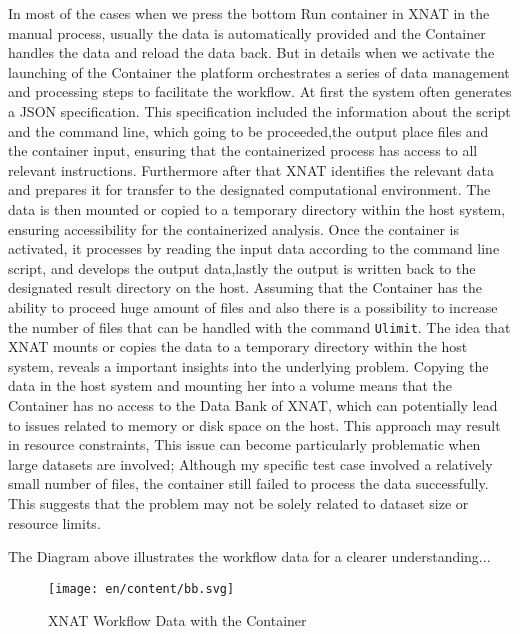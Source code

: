 In most of the cases when we press the bottom Run container in XNAT in the manual process, usually the data is automatically provided and the Container handles the data and reload the data back.
But in details when we activate the launching of the Container the platform orchestrates a series of data management and processing steps to facilitate the workflow. At first the system often generates a JSON specification. This specification included the information about the script and the command line, which going to be proceeded,the output place files and the container input, ensuring that the containerized process has access to all relevant instructions. Furthermore after that XNAT identifies the relevant data and prepares it for transfer to the designated computational environment. The data is then mounted or copied to a temporary directory within the host system, ensuring accessibility for the containerized analysis. Once the container is activated, it processes by reading the input data according to the command line script, and develops the output data,lastly the output is written back to the designated result directory on the host. 
Assuming  that the Container has the ability to proceed huge amount of files and also there is a possibility to increase the number of files that can be handled  with the command \texttt{Ulimit}. 
The idea that XNAT mounts or copies the data to a temporary directory within the host system, reveals a important insights into the underlying problem. Copying the data in the host system and mounting her into a volume means that the Container has no access to the Data Bank of XNAT, which can potentially lead to issues related to memory or disk space on the host. This approach may result in resource constraints, This issue can become particularly problematic when large datasets are involved; Although my specific test case involved a relatively small number of files, the container still failed to process the data successfully. This suggests that the problem may not be solely related to dataset size or resource limits.

The Diagram above illustrates the workflow data for a clearer understanding...\\


\begin{figure}
    \centering
    \texttt{[image: en/content/bb.svg]}
    \caption{XNAT Workflow Data with the Container  }
    \label{fig:enter-label}
\end{figure}




